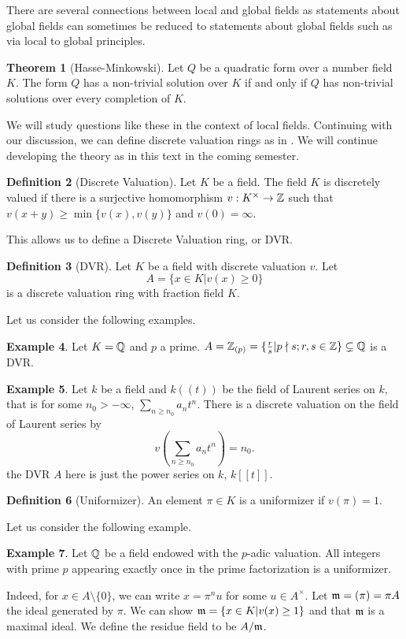 \documentclass{amsart}
\theoremstyle{definition}
\newtheorem{theorem}{Theorem}[section]
\newtheorem{example}[theorem]{Example}
\newtheorem{definition}[theorem]{Definition}
\numberwithin{equation}{section}
\begin{document}
There are several connections between local and global fields as statements about global fields can sometimes be reduced to statements about global fields such as via local to global principles. 
\begin{theorem}[Hasse-Minkowski]
  Let $Q$ be a quadratic form over a number field $K$. The form $Q$ has a non-trivial solution over $K$ if and only if $Q$ has non-trivial solutions over every completion of $K$. 
\end{theorem}
We will study questions like these in the context of local fields. Continuing with our discussion, we can define discrete valuation rings as in \cite[\S 1]{Serre}. We will continue developing the theory as in this text in the coming semester. 
\begin{definition}[Discrete Valuation]
  Let $K$ be a field. The field $K$ is discretely valued if there is a surjective homomorphism $v:K^{\times}\to\mathbb{Z}$ such that $v(x+y)\geq\min\{v(x),v(y)\}$ and $v(0)=\infty$. 
\end{definition}
This allows us to define a Discrete Valuation ring, or DVR. 
\begin{definition}[DVR]
  Let $K$ be a field with discrete valuation $v$. Let 
  $$A=\{x\in K|v(x)\geq0\}$$
  is a discrete valuation ring with fraction field $K$. 
\end{definition}
Let us consider the following examples. 
\begin{example}
  Let $K=\mathbb{Q}$ and $p$ a prime. $A=\mathbb{Z}_{(p)}=\{\frac{r}{s}|p\nmid s; r,s\in\mathbb{Z}\}\subsetneq\mathbb{Q}$ is a DVR. 
\end{example}
\begin{example}
  Let $k$ be a field and $k((t))$ be the field of Laurent series on $k$, that is for some $n_{0}>-\infty$, $\sum_{n\geq n_{0}}a_{n}t^{n}$. There is a discrete valuation on the field of Laurent series by
  $$v\left(\sum_{n\geq n_{0}}a_{n}t^{n}\right)=n_{0}.$$
  the DVR $A$ here is just the power series on $k$, $k[[t]]$.
\end{example}
\begin{definition}[Uniformizer]
  An element $\pi\in K$ is a uniformizer if $v(\pi)=1$. 
\end{definition}
Let us consider the following example.
\begin{example}
  Let $\mathbb{Q}$ be a field endowed with the $p$-adic valuation. All integers with prime $p$ appearing exactly once in the prime factorization is a uniformizer. 
\end{example}
Indeed, for $x\in A\setminus\{0\}$, we can write $x=\pi^{n}u$ for some $u\in A^{\times}$. Let $\mathfrak{m}=(\pi)=\pi A$ the ideal generated by $\pi$. We can show $\mathfrak{m}=\{x\in K|v(x)\geq1\}$ and that $\mathfrak{m}$ is a maximal ideal. We define the residue field to be $A/\mathfrak{m}$. 
\end{document}
